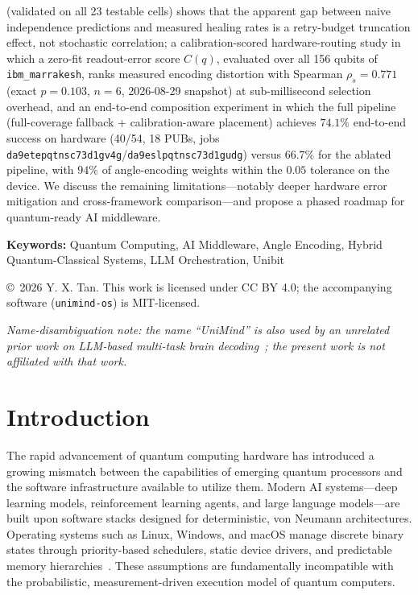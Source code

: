 ﻿\documentclass[12pt,a4paper]{article}
\begin{document}
\begin{titlepage}
\begin{minipage}{0.92\textwidth}
(validated on all 23 testable cells) shows that the apparent gap between naive independence predictions and measured healing rates is a retry-budget truncation effect, not stochastic correlation; a calibration-scored hardware-routing study in which a zero-fit readout-error score $C(q)$, evaluated over all 156 qubits of \texttt{ibm\_marrakesh}, ranks measured encoding distortion with Spearman $\rho_s = 0.771$ (exact $p = 0.103$, $n{=}6$, 2026-08-29 snapshot) at sub-millisecond selection overhead, and an end-to-end composition experiment in which the full pipeline (full-coverage fallback + calibration-aware placement) achieves $74.1\%$ end-to-end success on hardware (40/54, 18 PUBs, jobs \texttt{da9etepqtnsc73d1gv4g}/\texttt{da9eslpqtnsc73d1gudg}) versus $66.7\%$ for the ablated pipeline, with $94\%$ of angle-encoding weights within the $0.05$ tolerance on the device. We discuss the remaining limitations---notably deeper hardware error mitigation and cross-framework comparison---and propose a phased roadmap for quantum-ready AI middleware.
\end{minipage}

\vspace{0.8cm}

\noindent\textbf{Keywords:} Quantum Computing, AI Middleware, Angle Encoding, Hybrid Quantum-Classical Systems, LLM Orchestration, Unibit

\vfill

{\small\copyright\ 2026 Y. X. Tan. This work is licensed under CC BY 4.0; the accompanying software (\texttt{unimind-os}) is MIT-licensed.}

\vspace{0.4cm}

{\small\itshape Name-disambiguation note: the name ``UniMind'' is also used by an unrelated prior work on LLM-based multi-task brain decoding~\cite{lu2025unimind}; the present work is not affiliated with that work.\par}

\end{titlepage}

\tableofcontents
\newpage

\section{Introduction}

The rapid advancement of quantum computing hardware has introduced a growing mismatch between the capabilities of emerging quantum processors and the software infrastructure available to utilize them. Modern AI systems---deep learning models, reinforcement learning agents, and large language models---are built upon software stacks designed for deterministic, von Neumann architectures. Operating systems such as Linux, Windows, and macOS manage discrete binary states through priority-based schedulers, static device drivers, and predictable memory hierarchies~\cite{tanenbaum2023}. These assumptions are fundamentally incompatible with the probabilistic, measurement-driven execution model of quantum computers.
\end{document}
